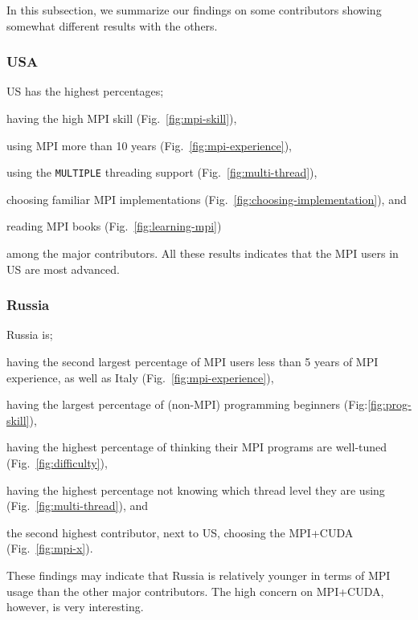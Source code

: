 \documentclass[preprint,5p,times]{elsarticle}
\def\country{contributor}%
\def\countries{contributors}%
\def\mcountries{major contributors}%
\begin{document}
In this subsection, we summarize our findings on some \countries
showing somewhat different results with the others.

\subsubsection*{USA}

US has the highest percentages;
\begin{enumerate*}
\item having the high MPI skill (Fig.~\ref{fig:mpi-skill}),
\item using MPI more than 10 years (Fig.~\ref{fig:mpi-experience}),
\item using the {\tt MULTIPLE} threading support
  (Fig.~\ref{fig:multi-thread}),
\item choosing familiar MPI implementations
  (Fig.~\ref{fig:choosing-implementation}), and
\item reading MPI books (Fig.~\ref{fig:learning-mpi})
\end{enumerate*}
among the \mcountries. All these results indicates that the MPI
users in US are most advanced.

\subsubsection*{Russia}

Russia is;
\begin{enumerate*}
\item having the second largest percentage of MPI users less than 5
  years of MPI experience, as well as Italy
  (Fig.~\ref{fig:mpi-experience}),
\item having the largest percentage of (non-MPI) programming beginners
  (Fig:\ref{fig:prog-skill}),
\item having the highest percentage of thinking their MPI programs are
  well-tuned (Fig.~\ref{fig:difficulty}),
\item having the highest percentage not knowing which thread level
  they are using (Fig.~\ref{fig:multi-thread}), and
\item the second highest \country, next to US, choosing the MPI+CUDA
  (Fig.~\ref{fig:mpi-x}).
\end{enumerate*}

These findings may indicate that Russia is relatively younger in terms
of MPI usage than the other \mcountries. The high concern on
MPI+CUDA, however, is very interesting.
\end{document}
